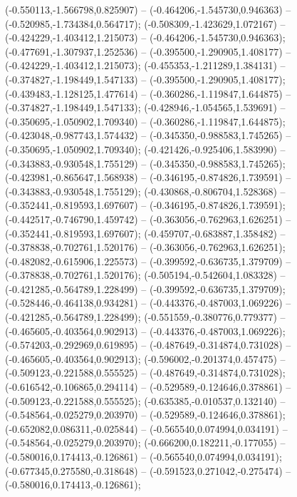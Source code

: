  (-0.550113,-1.566798,0.825907) -- (-0.464206,-1.545730,0.946363) -- (-0.520985,-1.734384,0.564717);
 (-0.508309,-1.423629,1.072167) -- (-0.424229,-1.403412,1.215073) -- (-0.464206,-1.545730,0.946363);
 (-0.477691,-1.307937,1.252536) -- (-0.395500,-1.290905,1.408177) -- (-0.424229,-1.403412,1.215073);
 (-0.455353,-1.211289,1.384131) -- (-0.374827,-1.198449,1.547133) -- (-0.395500,-1.290905,1.408177);
 (-0.439483,-1.128125,1.477614) -- (-0.360286,-1.119847,1.644875) -- (-0.374827,-1.198449,1.547133);
 (-0.428946,-1.054565,1.539691) -- (-0.350695,-1.050902,1.709340) -- (-0.360286,-1.119847,1.644875);
 (-0.423048,-0.987743,1.574432) -- (-0.345350,-0.988583,1.745265) -- (-0.350695,-1.050902,1.709340);
 (-0.421426,-0.925406,1.583990) -- (-0.343883,-0.930548,1.755129) -- (-0.345350,-0.988583,1.745265);
 (-0.423981,-0.865647,1.568938) -- (-0.346195,-0.874826,1.739591) -- (-0.343883,-0.930548,1.755129);
 (-0.430868,-0.806704,1.528368) -- (-0.352441,-0.819593,1.697607) -- (-0.346195,-0.874826,1.739591);
 (-0.442517,-0.746790,1.459742) -- (-0.363056,-0.762963,1.626251) -- (-0.352441,-0.819593,1.697607);
 (-0.459707,-0.683887,1.358482) -- (-0.378838,-0.702761,1.520176) -- (-0.363056,-0.762963,1.626251);
 (-0.482082,-0.615906,1.225573) -- (-0.399592,-0.636735,1.379709) -- (-0.378838,-0.702761,1.520176);
 (-0.505194,-0.542604,1.083328) -- (-0.421285,-0.564789,1.228499) -- (-0.399592,-0.636735,1.379709);
 (-0.528446,-0.464138,0.934281) -- (-0.443376,-0.487003,1.069226) -- (-0.421285,-0.564789,1.228499);
 (-0.551559,-0.380776,0.779377) -- (-0.465605,-0.403564,0.902913) -- (-0.443376,-0.487003,1.069226);
 (-0.574203,-0.292969,0.619895) -- (-0.487649,-0.314874,0.731028) -- (-0.465605,-0.403564,0.902913);
 (-0.596002,-0.201374,0.457475) -- (-0.509123,-0.221588,0.555525) -- (-0.487649,-0.314874,0.731028);
 (-0.616542,-0.106865,0.294114) -- (-0.529589,-0.124646,0.378861) -- (-0.509123,-0.221588,0.555525);
 (-0.635385,-0.010537,0.132140) -- (-0.548564,-0.025279,0.203970) -- (-0.529589,-0.124646,0.378861);
 (-0.652082,0.086311,-0.025844) -- (-0.565540,0.074994,0.034191) -- (-0.548564,-0.025279,0.203970);
 (-0.666200,0.182211,-0.177055) -- (-0.580016,0.174413,-0.126861) -- (-0.565540,0.074994,0.034191);
 (-0.677345,0.275580,-0.318648) -- (-0.591523,0.271042,-0.275474) -- (-0.580016,0.174413,-0.126861);
